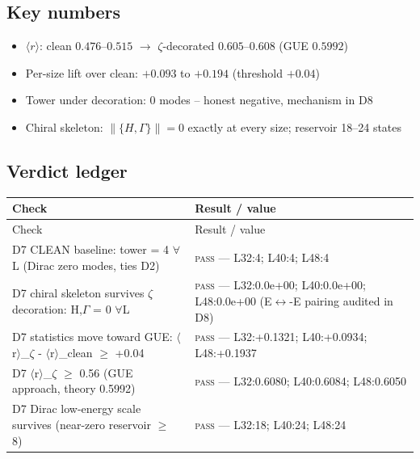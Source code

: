 \documentclass[11pt,a4paper]{article}
\begin{document}
\subsection{Key numbers}
\begin{tcolorbox}[colback=labblue!6, colframe=labblue!70!black, boxrule=0.6pt, title={Key results (canonical run)}]
\begin{itemize}[leftmargin=1.2em, itemsep=0.15em]
\item $\langle r\rangle$: clean $0.476$--$0.515$ $\to$ $\zeta$-decorated $0.605$--$0.608$ (GUE $0.5992$)
\item Per-size lift over clean: $+0.093$ to $+0.194$ (threshold $+0.04$)
\item Tower under decoration: $0$ modes -- honest negative, mechanism in D8
\item Chiral skeleton: $\|\{H,\Gamma\}\| = 0$ exactly at every size; reservoir 18--24 states
\end{itemize}
\end{tcolorbox}

\subsection{Verdict ledger}
\begin{longtable}{@{}p{}p{}@{}}
\toprule
Check & Result / value \\
\midrule
\endfirsthead
\toprule
Check & Result / value \\
\midrule
\endhead
\bottomrule
\endfoot
D7 CLEAN baseline: tower = 4 $\forall$L (Dirac zero modes, ties D2) & \textsc{pass} --- L32:4; L40:4; L48:4 \\
D7 chiral skeleton survives $\zeta$ decoration: {H,$\Gamma$} = 0 $\forall$L & \textsc{pass} --- L32:0.0e+00; L40:0.0e+00; L48:0.0e+00 (E$\leftrightarrow$-E pairing audited in D8) \\
D7 statistics move toward GUE: $\langle$r$\rangle$\_$\zeta$ - $\langle$r$\rangle$\_clean $\ge$ +0.04 & \textsc{pass} --- L32:+0.1321; L40:+0.0934; L48:+0.1937 \\
D7 $\langle$r$\rangle$\_$\zeta$ $\ge$ 0.56 (GUE approach, theory 0.5992) & \textsc{pass} --- L32:0.6080; L40:0.6084; L48:0.6050 \\
D7 Dirac low-energy scale survives (near-zero reservoir $\ge$ 8) & \textsc{pass} --- L32:18; L40:24; L48:24 \\
\end{longtable}
\end{document}
